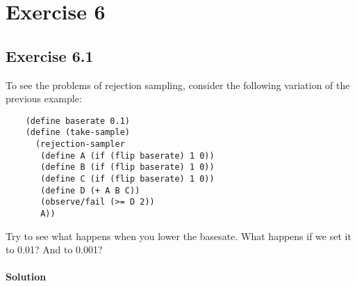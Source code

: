 \section*{Exercise 6}

\subsection*{Exercise 6.1}
To see the problems of rejection sampling, consider the following variation of the previous example:

\begin{lstlisting}
    (define baserate 0.1)
    (define (take-sample)
      (rejection-sampler
       (define A (if (flip baserate) 1 0))
       (define B (if (flip baserate) 1 0))
       (define C (if (flip baserate) 1 0))
       (define D (+ A B C))
       (observe/fail (>= D 2))
       A))
\end{lstlisting}

Try to see what happens when you lower the basesate. What happens if we set it to 0.01? And to 0.001?

\paragraph{Solution}